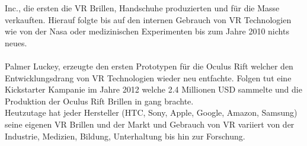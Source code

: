 Inc., die ersten die VR Brillen, Handschuhe produzierten und für die Masse verkauften. Hierauf folgte bis auf den internen Gebrauch von VR
Technologien wie von der Nasa oder medizinischen Experimenten bis zum Jahre 2010 nichts neues.\cite{virtualrealityhistory} \\ \\
Palmer Luckey, erzeugte den ersten Prototypen für die Oculus Rift welcher den Entwicklungsdrang von VR Technologien wieder neu entfachte.  
Folgen tut eine Kickstarter Kampanie im Jahre 2012 welche 2.4 Millionen USD sammelte und die Produktion der Oculus Rift Brillen
in gang brachte.\\
Heutzutage hat jeder Hersteller (HTC, Sony, Apple, Google, Amazon, Samsung) seine eigenen VR Brillen und der Markt und Gebrauch von VR
variiert von der Industrie, Medizien, Bildung, Unterhaltung bis hin zur Forschung.\cite{virtualrealityhistory}

